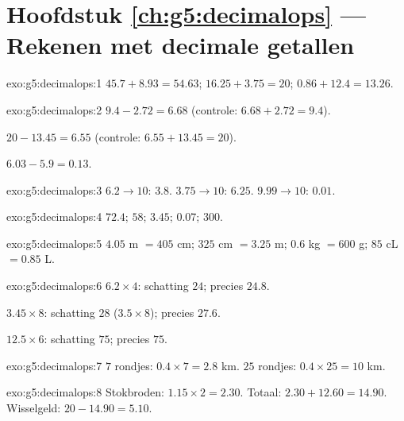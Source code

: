 \section*{Hoofdstuk \ref{ch:g5:decimalops} --- Rekenen met decimale getallen}

\begin{solution}{exo:g5:decimalops:1}
$45.7 + 8.93 = 54.63$; \quad
$16.25 + 3.75 = 20$; \quad
$0.86 + 12.4 = 13.26$.
\end{solution}

\begin{solution}{exo:g5:decimalops:2}
$9.4 - 2.72 = 6.68$ (controle: $6.68 + 2.72 = 9.4$).

$20 - 13.45 = 6.55$ (controle: $6.55 + 13.45 = 20$).

$6.03 - 5.9 = 0.13$.
\end{solution}

\begin{solution}{exo:g5:decimalops:3}
$6.2 \to 10$: $3.8$. \quad $3.75 \to 10$: $6.25$. \quad
$9.99 \to 10$: $0.01$.
\end{solution}

\begin{solution}{exo:g5:decimalops:4}
$72.4$; \quad $58$; \quad $3.45$; \quad $0.07$; \quad $300$.
\end{solution}

\begin{solution}{exo:g5:decimalops:5}
$4.05$ m $= 405$ cm; \quad $325$ cm $= 3.25$ m; \quad
$0.6$ kg $= 600$ g; \quad $85$ cL $= 0.85$ L.
\end{solution}

\begin{solution}{exo:g5:decimalops:6}
$6.2 \times 4$: schatting $24$; precies $24.8$.

$3.45 \times 8$: schatting $28$ ($3.5 \times 8$); precies $27.6$.

$12.5 \times 6$: schatting $75$; precies $75$.
\end{solution}

\begin{solution}{exo:g5:decimalops:7}
$7$ rondjes: $0.4 \times 7 = 2.8$ km. $25$ rondjes:
$0.4 \times 25 = 10$ km.
\end{solution}

\begin{solution}{exo:g5:decimalops:8}
Stokbroden: $1.15 \times 2 = 2.30$. Totaal: $2.30 + 12.60 = 14.90$.
Wisselgeld: $20 - 14.90 = 5.10$.
\end{solution}

